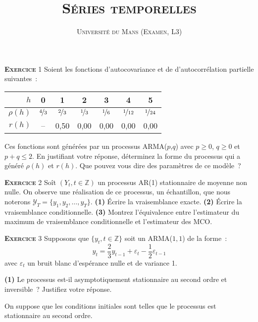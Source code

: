 \documentclass[10pt,a4paper,notitlepage,twocolumn]{article}
\newcommand{\exercice}[1]{\textsc{\textbf{Exercice}} #1}
\newcommand{\question}[1]{\textbf{(#1)}}
\begin{document}
\title{\textsc{Séries temporelles}}
\author{\textsc{Université du Mans (Examen, L3)}}
\date{}


\maketitle

\exercice{1} Soient les fonctions d'autocovariance et de d'autocorrélation
partielle suivantes :
\begin{table}[H]
  \centering
  \begin{tabular}{r|cccccc}
    \hline\hline
    $h$ & 0 & 1 & 2 & 3 & 4 & 5 \\\hline
    $\rho (h)$ & $\nicefrac{4}{3}$ & $\nicefrac{2}{3}$ & $\nicefrac{1}{3}$ & $\nicefrac{1}{6}$ & $\nicefrac{1}{12}$ & $\nicefrac{1}{24}$\\
    $r (h)$ & -- & 0,50 & 0,00 & 0,00 & 0,00 & 0,00\\
    \hline\hline
  \end{tabular}
\end{table}
\noindent Ces  fonctions sont générées par  un processus ARMA($p$,$q$)
avec $p\geq 0$, $q\geq 0$ et $p+q \leq 2$. En
justifiant  votre réponse,  déterminez la forme  du  processus qui  a
généré $\rho(h)$ et $r(h)$. Que pouvez vous dire des paramètres de ce
modèle~?

\bigskip
\bigskip

\exercice{2} Soît $(Y_t,t\in\mathbb Z)$ un processus AR(1) stationnaire de
moyenne non nulle. On observe une réalisation de ce processus, un échantillon,
que nous noterons $\mathcal Y_T = \{y_1,y_2,\dots,y_T\}$. \question{1} Écrire la
vraisemblance exacte. \question{2} Écrire la vraisemblance conditionnelle.
\question{3} Montrez l'équivalence entre l'estimateur du maximum de
vraisemblance conditionnelle et l'estimateur des MCO.


\bigskip
\bigskip

\exercice{3} Supposons que $\{y_t,t\in\mathbb Z\}$ soit un ARMA($1,1$) de la forme :
\[
y_t = \frac{2}{3}y_{t-1} + \varepsilon_t - \frac{1}{2} \varepsilon_{t-1}
\]
avec $\varepsilon_t$ un bruit blanc d'espérance nulle et de variance 1.\newline

\question{1} Le processus est-il asymptotiquement stationnaire au second ordre
et inversible~? Justifiez votre réponse.\newline

On suppose  que les conditions initiales sont telles que le
processus est stationnaire au second ordre.\newline
\end{document}
